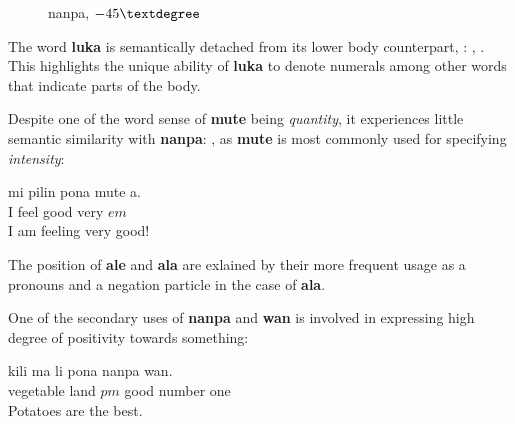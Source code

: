 \documentclass[14pt, a4paper]{extreport}
\makeatletter
\DeclareRobustCommand\ttfamily
        {\not@math@alphabet\ttfamily\mathtt
         \fontfamily\ttdefault\small\selectfont}
\makeatother
\begin{document}
\begin{figure}[ht]%
  \def\angle{-45}
  \bigskip
  \centering
  \caption{nanpa, \(\angle\textdegree\)}
\end{figure}%

The word \textbf{luka} is semantically detached from its lower body counterpart, : , . This highlights the unique ability of \textbf{luka} to denote numerals among other words that indicate parts of the body.

Despite one of the word sense of \textbf{mute} being \textit{quantity}, it experiences little semantic similarity with \textbf{nanpa}: , as \textbf{mute} is most commonly used for specifying \textit{intensity}:

\begin{exe}
  \ex
  \gll mi pilin pona mute a. \\
       I feel good very $em$ \\
  \glt I am feeling very good!
\end{exe}

The position of \textbf{ale} and \textbf{ala} are exlained by their more frequent usage as a pronouns and a negation particle in the case of \textbf{ala}.

One of the secondary uses of \textbf{nanpa} and \textbf{wan} is involved in expressing high degree of positivity towards something:

\begin{exe}
  \ex
  \gll kili ma li pona nanpa wan. \\
       vegetable land $pm$ good number one \\
  \glt Potatoes are the best.
\end{exe}
\end{document}

